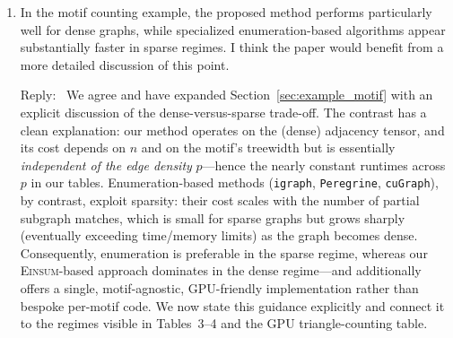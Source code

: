 \documentclass[12pt]{article}
\newenvironment{reply}{\par\smallskip\noindent\color{blue}Reply:\ \ignorespaces}{\par}
\newcommand{\Einsum}{\textsc{Einsum}}
\newcommand{\less}{O}          %
\begin{document}
\begin{enumerate}
\begin{reply}
We agree that space complexity deserves a fuller treatment and have added one. The memory footprint has two parts: storing the component tensors after tensorization, costing $\less\!\big(\sum_k n^{|A_k|}\big)$, and storing the intermediate tensors produced during the \Einsum{} contraction. For an ordering that realizes treewidth $w$, the largest intermediate tensor has $\less(n^{w+1})$ entries, so the peak memory scales as $\less(n^{w+1})$ for a $V$-statistic and $\less(n^{M+1})$ for a $U$-statistic---the same exponent that governs the time complexity. This is precisely the reason, noted in the Concluding Remarks, that very high-order tensors force $n$ to be moderate (e.g.\ HOIF order $\le 7$ at $n=10^4$). In the revision we (i) add this $\less(n^{w+1})$ memory analysis explicitly to Sections~3.2--3.3, and (ii) report empirical peak-memory usage alongside runtime in the numerical experiments (an added memory column in the HOIF and motif-counting tables). We have also strengthened the Concluding Remarks to highlight the time--space trade-off as a central direction for future work.
\end{reply}

\item In the motif counting example, the proposed method performs particularly well for dense graphs, while specialized enumeration-based algorithms appear substantially faster in sparse regimes. I think the paper would benefit from a more detailed discussion of this point.

\begin{reply}
We agree and have expanded Section~\ref{sec:example_motif} with an explicit discussion of the dense-versus-sparse trade-off. The contrast has a clean explanation: our method operates on the (dense) adjacency tensor, and its cost depends on $n$ and on the motif's treewidth but is essentially \emph{independent of the edge density} $p$---hence the nearly constant runtimes across $p$ in our tables. Enumeration-based methods (\texttt{igraph}, \texttt{Peregrine}, \texttt{cuGraph}), by contrast, exploit sparsity: their cost scales with the number of partial subgraph matches, which is small for sparse graphs but grows sharply (eventually exceeding time/memory limits) as the graph becomes dense. Consequently, enumeration is preferable in the sparse regime, whereas our \Einsum{}-based approach dominates in the dense regime---and additionally offers a single, motif-agnostic, GPU-friendly implementation rather than bespoke per-motif code. We now state this guidance explicitly and connect it to the regimes visible in Tables~3--4 and the GPU triangle-counting table.
\end{reply}

\end{enumerate}

% 
% 
\end{document}

